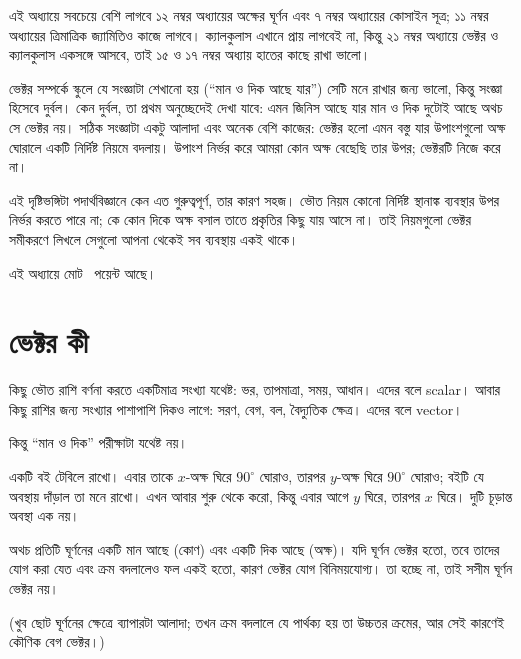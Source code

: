 \documentclass[11pt]{article}
\begin{document}

\noindent
এই অধ্যায়ে সবচেয়ে বেশি লাগবে ১২ নম্বর অধ্যায়ের অক্ষের ঘূর্ণন এবং
৭ নম্বর অধ্যায়ের কোসাইন সূত্র; ১১ নম্বর অধ্যায়ের ত্রিমাত্রিক
জ্যামিতিও কাজে লাগবে। ক্যালকুলাস এখানে প্রায় লাগবেই না, কিন্তু ২১ নম্বর
অধ্যায়ে ভেক্টর ও ক্যালকুলাস একসঙ্গে আসবে, তাই ১৫ ও ১৭ নম্বর অধ্যায়
হাতের কাছে রাখা ভালো।

ভেক্টর সম্পর্কে স্কুলে যে সংজ্ঞাটা শেখানো হয় (``মান ও দিক আছে যার'') সেটি
মনে রাখার জন্য ভালো, কিন্তু সংজ্ঞা হিসেবে দুর্বল। কেন দুর্বল, তা প্রথম অনুচ্ছেদেই দেখা যাবে: এমন জিনিস আছে যার মান ও দিক দুটোই আছে অথচ সে ভেক্টর নয়।
সঠিক সংজ্ঞাটা একটু আলাদা এবং অনেক বেশি কাজের: ভেক্টর হলো এমন বস্তু যার
উপাংশগুলো অক্ষ ঘোরালে একটি নির্দিষ্ট নিয়মে বদলায়। উপাংশ নির্ভর করে
আমরা কোন অক্ষ বেছেছি তার উপর; ভেক্টরটি নিজে করে না।

এই দৃষ্টিভঙ্গিটা পদার্থবিজ্ঞানে কেন এত গুরুত্বপূর্ণ, তার কারণ সহজ। ভৌত নিয়ম
কোনো নির্দিষ্ট স্থানাঙ্ক ব্যবস্থার উপর নির্ভর করতে পারে না; কে কোন দিকে অক্ষ
বসাল তাতে প্রকৃতির কিছু যায় আসে না। তাই নিয়মগুলো ভেক্টর সমীকরণে লিখলে সেগুলো
আপনা থেকেই সব ব্যবস্থায় একই থাকে।

এই অধ্যায়ে মোট \totalpoints\ পয়েন্ট আছে।

\section{ভেক্টর কী}

কিছু ভৌত রাশি বর্ণনা করতে একটিমাত্র সংখ্যা যথেষ্ট: ভর, তাপমাত্রা, সময়, আধান।
এদের বলে scalar। আবার কিছু রাশির জন্য সংখ্যার পাশাপাশি দিকও লাগে: সরণ, বেগ,
বল, বৈদ্যুতিক ক্ষেত্র। এদের বলে vector।

কিন্তু ``মান ও দিক'' পরীক্ষাটা যথেষ্ট নয়।

\begin{remark}
একটি বই টেবিলে রাখো। এবার তাকে $x$-অক্ষ ঘিরে $90^{\circ}$ ঘোরাও, তারপর
$y$-অক্ষ ঘিরে $90^{\circ}$ ঘোরাও; বইটি যে অবস্থায় দাঁড়াল তা মনে রাখো। এখন
আবার শুরু থেকে করো, কিন্তু এবার আগে $y$ ঘিরে, তারপর $x$ ঘিরে। দুটি চূড়ান্ত
অবস্থা এক নয়।

অথচ প্রতিটি ঘূর্ণনের একটি মান আছে (কোণ) এবং একটি দিক আছে (অক্ষ)। যদি ঘূর্ণন
ভেক্টর হতো, তবে তাদের যোগ করা যেত এবং ক্রম বদলালেও ফল একই হতো, কারণ ভেক্টর
যোগ বিনিময়যোগ্য। তা হচ্ছে না, তাই সসীম ঘূর্ণন ভেক্টর নয়।

(খুব ছোট ঘূর্ণনের ক্ষেত্রে ব্যাপারটা আলাদা; তখন ক্রম বদলালে যে পার্থক্য হয় তা
উচ্চতর ক্রমের, আর সেই কারণেই কৌণিক বেগ ভেক্টর।)
\end{remark}
\end{document}
